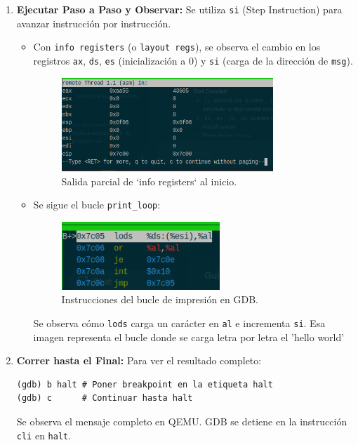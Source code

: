 \begin{enumerate}[noitemsep]
    \item \textbf{Ejecutar Paso a Paso y Observar:} Se utiliza \texttt{si} (Step Instruction) para avanzar instrucción por instrucción.
        \begin{itemize}
            \item Con \texttt{info registers} (o \texttt{layout regs}), se observa el cambio en los registros \texttt{ax}, \texttt{ds}, \texttt{es} (inicialización a 0) y \texttt{si} (carga de la dirección de \texttt{msg}).
              \begin{figure}[H]
                  \centering
                  \includegraphics[width=0.8\textwidth]{images/registers7c00.png}
                  \caption{Salida parcial de `info registers` al inicio.}
              \end{figure}
            \item Se sigue el bucle \texttt{print\_loop}:
              \begin{figure}[H]
                  \centering
                  \includegraphics[width=0.6\textwidth]{images/bucle.png}
                  \caption{Instrucciones del bucle de impresión en GDB.}
              \end{figure}
              Se observa cómo \texttt{lods} carga un carácter en \texttt{al} e incrementa \texttt{si}. 
              Esa imagen representa el bucle donde se carga letra por letra el 'hello world'
        \end{itemize}

    \item \textbf{Correr hasta el Final:} Para ver el resultado completo:
        \begin{lstlisting}[style=GdbStyle]
(gdb) b halt # Poner breakpoint en la etiqueta halt
(gdb) c      # Continuar hasta halt
        \end{lstlisting}
        Se observa el mensaje completo en QEMU. GDB se detiene en la instrucción \texttt{cli} en \texttt{halt}.


\end{enumerate}
